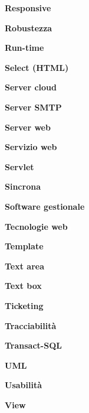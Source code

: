 \textbf{Responsive}

\textbf{Robustezza}

\textbf{Run-time}

\textbf{Select (HTML)}

\textbf{Server cloud}

\textbf{Server SMTP}

\textbf{Server web}

\textbf{Servizio web}

\textbf{Servlet}

\textbf{Sincrona}

\textbf{Software gestionale}

\textbf{Tecnologie web}

\textbf{Template}

\textbf{Text area}

\textbf{Text box}

\textbf{Ticketing}

\textbf{Tracciabilità}

\textbf{Transact-SQL}

\textbf{UML}

\textbf{Usabilità}

\textbf{View}